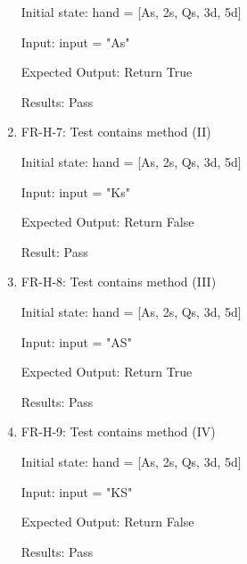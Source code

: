 \documentclass[12pt, titlepage]{article}
\begin{document}
\begin{enumerate}
    Initial state: hand = [As, 2s, Qs, 3d, 5d]
    
    Input: input = "As"
    
    Expected Output: Return True
    
    Results: Pass
    
    \item FR-H-7: Test contains method (II)
    
    Initial state: hand = [As, 2s, Qs, 3d, 5d]
    
    Input: input = "Ks"
    
    Expected Output: Return False
    
    Result: Pass
    
    \item FR-H-8: Test contains method (III)
    
    Initial state: hand = [As, 2s, Qs, 3d, 5d]
    
    Input: input = "AS"
    
    Expected Output: Return True
    
    Results: Pass
    
    \item FR-H-9: Test contains method (IV)
    
    Initial state: hand = [As, 2s, Qs, 3d, 5d]
    
    Input: input = "KS"
    
    Expected Output: Return False
    
    Results: Pass
\end{enumerate}
\end{document}
